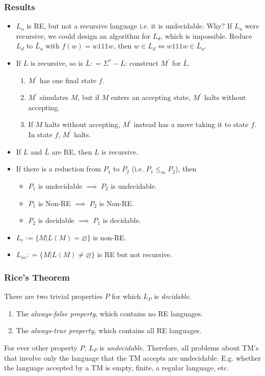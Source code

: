 \subsubsection{Results}
\begin{itemize}
    \item $L_u$ is RE, but not a recursive language i.e. it is undecidable. Why? If $L_u$ were recursive, we could design an algorithm for $L_d$, which is impossible. Reduce $L_d$ to $\bar L_u$ with $f(w) = w111w$, then $w \in L_d \iff w111w \in \bar L_u.$
    \item If $L$ is recursive, so is $\bar L: =\Sigma ^* -L$: construct $M^\prime$ for $\bar L$. 
    \begin{enumerate}
        \item $M^\prime$ has one final state $f$. 
        \item $M^\prime$ simulates $M$, but if $M$ enters an accepting state, $M^\prime$ halts without accepting.
        \item If $M$ halts without accepting, $M^\prime$ instead has a move taking it to state $f$. In state $f$, $M^\prime$ halts.
    \end{enumerate}
    \item If $L$ and $\bar L$ are RE, then $L$ is recursive. 
    \item If there is a reduction from $P_1$ to $P_2$  (i.e. $P_1 \leq_m P_2$), then
    \begin{itemize}
        \item $P_1$ is undecidable $\implies \; P_2$ is undecidable.
        \item $P_1$ is Non-RE $\implies \; P_2$ is Non-RE.
        \item $P_2$ is decidable $\implies \; P_1$ is decidable.
    \end{itemize}
    \item $L_e := \{M | L(M) = \varnothing\}$ is non-RE.
    \item $L_{ne} : = \{ M | L(M) \neq \varnothing \} $ is RE but not recursive.
    \end{itemize}
    
\subsubsection{Rice's Theorem}
There are two trivial properties $P$ for which $L_P$ is \textit{decidable}.
\begin{enumerate}
    \item The \textit{always-false property}, which contains no RE languages.
    \item The \textit{always-true property}, which contains all RE languages.
\end{enumerate}
For ever other property $P$, $L_P$ is \textit{undecidable.} Therefore, all problems  about TM's that involve only the language that the TM accepts are undecidable. E.g. whether the language accepted by a TM is empty, finite, a regular language, etc.

